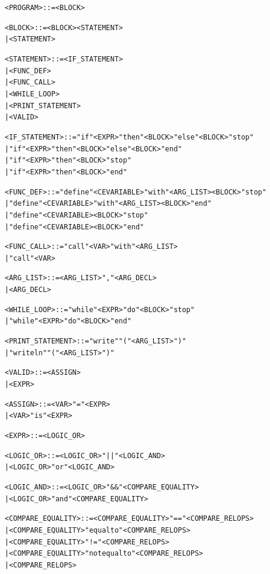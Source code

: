 \documentclass{article}
\begin{document}
\begin{alltt}
<PROGRAM>           ::= <BLOCK>

<BLOCK>             ::= <BLOCK> <STATEMENT>
                    |   <STATEMENT>

<STATEMENT>         ::= <IF_STATEMENT>
                    |   <FUNC_DEF>
                    |   <FUNC_CALL>
                    |   <WHILE_LOOP>
                    |   <PRINT_STATEMENT>
                    |   <VALID>

<IF_STATEMENT>      ::= "if" <EXPR> "then" <BLOCK> "else" <BLOCK> "stop"
                    |   "if" <EXPR> "then" <BLOCK> "else" <BLOCK> "end"
                    |   "if" <EXPR> "then" <BLOCK> "stop"
                    |   "if" <EXPR> "then" <BLOCK> "end"
                        
<FUNC_DEF>          ::= "define" <CEVARIABLE> "with" <ARG_LIST> <BLOCK> "stop"
                    |   "define" <CEVARIABLE> "with" <ARG_LIST> <BLOCK> "end"
                    |   "define" <CEVARIABLE> <BLOCK> "stop"
                    |   "define" <CEVARIABLE> <BLOCK> "end"

<FUNC_CALL>         ::= "call" <VAR> "with" <ARG_LIST>
                    |   "call" <VAR>
                    
<ARG_LIST>          ::= <ARG_LIST> "," <ARG_DECL>
                    |   <ARG_DECL>
                    
<WHILE_LOOP>        ::= "while" <EXPR> "do" <BLOCK> "stop"
                    |   "while" <EXPR> "do" <BLOCK> "end"
                    
<PRINT_STATEMENT>   ::= "write" "(" <ARG_LIST> ")"
                    |   "writeln" "(" <ARG_LIST> ")"            
                    
<VALID>             ::= <ASSIGN>
                    |   <EXPR>
                    
<ASSIGN>            ::= <VAR> "=" <EXPR>
                    |   <VAR> "is" <EXPR>
                    
<EXPR>              ::= <LOGIC_OR>

<LOGIC_OR>          ::= <LOGIC_OR> "||" <LOGIC_AND>
                    |   <LOGIC_OR> "or" <LOGIC_AND>
                    
<LOGIC_AND>         ::= <LOGIC_OR> "&&" <COMPARE_EQUALITY>
                    |   <LOGIC_OR> "and" <COMPARE_EQUALITY>
                    
<COMPARE_EQUALITY>  ::= <COMPARE_EQUALITY> "==" <COMPARE_RELOPS>
                    |   <COMPARE_EQUALITY> "equal to" <COMPARE_RELOPS>
                    |   <COMPARE_EQUALITY> "!=" <COMPARE_RELOPS>
                    |   <COMPARE_EQUALITY> "not equal to" <COMPARE_RELOPS>
                    |   <COMPARE_RELOPS>
                    

\end{alltt}
\end{document}
